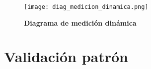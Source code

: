 \begin{figure}
     \centering
     \texttt{[image: diag\_medicion\_dinamica.png]}
     \caption{\textbf{Diagrama de medición dinámica}}
     \label{fig:diag_medicion_dinamica}
\end{figure}

\section{Validación patrón}

%
%
%
%
%
%
%
%
%
%
%
